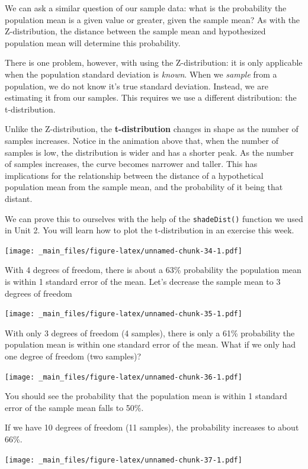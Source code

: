 \documentclass[
]{book}
\begin{document}
We can ask a similar question of our sample data: what is the
probability the population mean is a given value or greater, given the
sample mean? As with the Z-distribution, the distance between the sample
mean and hypothesized population mean will determine this probability.

There is one problem, however, with using the Z-distribution: it is only
applicable when the population standard deviation is \emph{known}. When we
\emph{sample} from a population, we do not know it's true standard deviation.
Instead, we are estimating it from our samples. This requires we use a
different distribution: the t-distribution.

Unlike the Z-distribution, the \textbf{t-distribution} changes in shape as
the number of samples increases. Notice in the animation above that,
when the number of samples is low, the distribution is wider and has a
shorter peak. As the number of samples increases, the curve becomes
narrower and taller. This has implications for the relationship between
the distance of a hypothetical population mean from the sample mean, and
the probability of it being that distant.

We can prove this to ourselves with the help of the \texttt{shadeDist()}
function we used in Unit 2. You will learn how to plot the
t-distribution in an exercise this week.

\texttt{[image: \_main\_files/figure-latex/unnamed-chunk-34-1.pdf]}

With 4 degrees of freedom, there is about a 63\% probability the
population mean is within 1 standard error of the mean. Let's decrease
the sample mean to 3 degrees of freedom

\texttt{[image: \_main\_files/figure-latex/unnamed-chunk-35-1.pdf]}

With only 3 degrees of freedom (4 samples), there is only a 61\%
probability the population mean is within one standard error of the
mean. What if we only had one degree of freedom (two samples)?

\texttt{[image: \_main\_files/figure-latex/unnamed-chunk-36-1.pdf]}

You should see the probability that the population mean is within 1
standard error of the sample mean falls to 50\%.

If we have 10 degrees of freedom (11 samples), the probability increases
to about 66\%.

\texttt{[image: \_main\_files/figure-latex/unnamed-chunk-37-1.pdf]}
\end{document}
